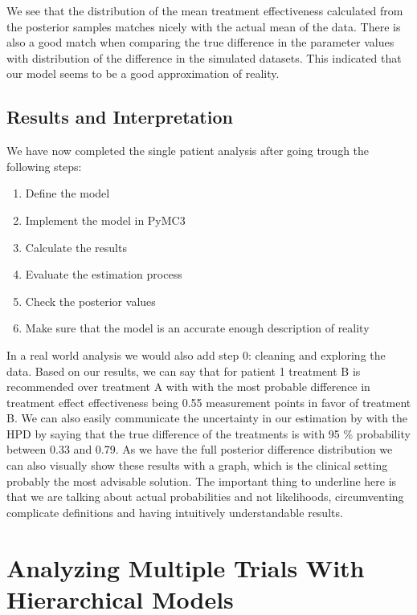 \documentclass[12pt,a4paper,leqno]{report}
\theoremstyle{plain}
\theoremstyle{definition}
\theoremstyle{remark}
\begin{document}
We see that the distribution of the mean treatment effectiveness calculated from the
posterior samples matches nicely with the actual mean of the data. There is also a good
match when comparing the true difference in the parameter values with distribution of
the difference in the simulated datasets. This indicated that our
model seems to be a good approximation of reality.

\subsection{Results and Interpretation}

We have now completed the single patient analysis after going trough the following steps:

\begin{enumerate}
    \item Define the model
    \item Implement the model in PyMC3
    \item Calculate the results
    \item Evaluate the estimation process
    \item Check the posterior values
    \item Make sure that the model is an accurate enough description of reality
\end{enumerate}

In a real world analysis we would also add step 0: cleaning and exploring the data.
Based on our results, we can say that for patient 1 treatment B is recommended over treatment A with
with the most probable difference in treatment effect effectiveness being 0.55
measurement points in favor of treatment B. We can also easily communicate
the uncertainty in our estimation by with the HPD by saying that the true difference of
the treatments is with 95 \% probability between 0.33 and 0.79. As we have the full
posterior difference distribution we can also visually show these results with a graph,
which is the clinical setting probably the most advisable solution. The important thing
to underline here is that we are talking about actual probabilities and not likelihoods,
circumventing complicate definitions and having intuitively understandable results.

\section{Analyzing Multiple Trials With Hierarchical Models}\label{pooling}
\end{document}
